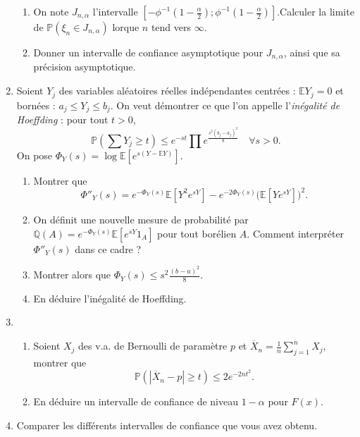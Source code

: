 \begin{enumerate}
\begin{enumerate}
	\item On note $J_{n,\alpha}$ l'intervalle $[-\phi^{-1}(1-\frac{\alpha}{2});\phi^{-1}(1-\frac{\alpha}{2})]$.Calculer la limite de $\mathbb P(\xi_n\in J_{n,\alpha})$ lorque $n$ tend vers $\infty$.
	\item Donner un intervalle de confiance asymptotique pour $J_{n,\alpha}$, ainsi que sa précision asymptotique.
	\end{enumerate}
\item Soient $Y_j$ des variables aléatoires réelles indépendantes centrées : $\mathbb E Y_j = 0 $ et bornées : $a_j \leq Y_j \leq b_j$. On veut démontrer ce que l'on appelle l'\textit{inégalité de Hoeffding} : pour tout $t>0$, 
\[\mathbb P(\sum Y_j \geq t )\leq e^{-st}\prod e^{\frac{s^2(b_j-a_j)^2}{8}}\quad\forall s >0.\]
On pose $\Phi_Y(s)=\log \mathbb E[e^{s(Y-\mathbb E Y)}]$. 
	\begin{enumerate}
	\item Montrer que \[\Phi''_Y(s)=e^{-\Phi_Y(s)}\mathbb E[Y^2 e^{sY}]-e^{-2\Phi_Y(s)}\mathbb (\mathbb E[Ye^{sY}])^2.\]
	\item On définit une nouvelle mesure de probabilité par $\mathbb Q(A)= e^{-\Phi_Y(s)}\mathbb E[e^{sY}1_A]$ pour tout borélien $A$. Comment interpréter $ \Phi''_Y(s)$ dans ce cadre ?
	\item Montrer alors que $\Phi_Y(s)\leq s^2 \frac{(b-a)^2}{8}$.
	\item En déduire l'inégalité de Hoeffding.
	\end{enumerate}

\item \begin{enumerate}
	\item Soient $X_j$ des v.a. de Bernoulli de paramètre $p$ et $\overline X_n = \frac{1}{n}\sum_{j=1}^n X_j$, montrer que 
		\[\mathbb P(|\overline X_n-p|\geq t)\leq 2e^{-2nt^2}.\] 
	\item En déduire un intervalle de confiance de niveau $1-\alpha$ pour $F(x)$.
	\end{enumerate}
\item Comparer les différents intervalles de confiance que vous avez obtenu.
\end{enumerate}

